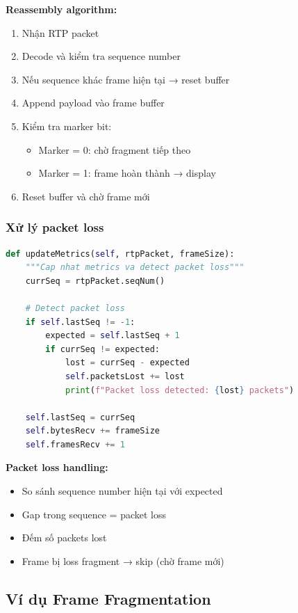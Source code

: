 \textbf{Reassembly algorithm:}
\begin{enumerate}
    \item Nhận RTP packet
    \item Decode và kiểm tra sequence number
    \item Nếu sequence khác frame hiện tại → reset buffer
    \item Append payload vào frame buffer
    \item Kiểm tra marker bit:
    \begin{itemize}
        \item Marker = 0: chờ fragment tiếp theo
        \item Marker = 1: frame hoàn thành → display
    \end{itemize}
    \item Reset buffer và chờ frame mới
\end{enumerate}

\subsubsection{Xử lý packet loss}

\begin{lstlisting}[language=Python, caption={Packet Loss Detection}]
def updateMetrics(self, rtpPacket, frameSize):
    """Cap nhat metrics va detect packet loss"""
    currSeq = rtpPacket.seqNum()
    
    # Detect packet loss
    if self.lastSeq != -1:
        expected = self.lastSeq + 1
        if currSeq != expected:
            lost = currSeq - expected
            self.packetsLost += lost
            print(f"Packet loss detected: {lost} packets")
    
    self.lastSeq = currSeq
    self.bytesRecv += frameSize
    self.framesRecv += 1
\end{lstlisting}

\textbf{Packet loss handling:}
\begin{itemize}
    \item So sánh sequence number hiện tại với expected
    \item Gap trong sequence = packet loss
    \item Đếm số packets lost
    \item Frame bị loss fragment → skip (chờ frame mới)
\end{itemize}

\subsection{Ví dụ Frame Fragmentation}

